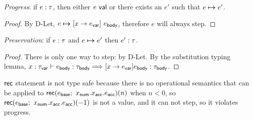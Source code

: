 \documentclass[11pt]{article}
\begin{document}
\textit{Progress}: if $e : \tau$, then either $e\ \mathsf{val}$ or there exists an $e'$ such that $e \boldsymbol{\mapsto} e'$.

\begin{proof}
  By D-Let, $e \boldsymbol{\mapsto} [x \rightarrow e_{\mathsf{var}}] ~ e_{\mathsf{body}}$, therefore $e$ will always step.
\end{proof}

\textit{Preservation}: if $e : \tau$ and $e \boldsymbol{\mapsto} e'$ then $e' : \tau$.

\begin{proof}
  There is only one way to step: by D-Let. By the substitution typing lemma, $x : \tau_{\mathsf{var} }  \vdash e_{\mathsf{body}}  : \tau_{\mathsf{body}}\Longrightarrow[x\to e_{\mathsf{var}}]e_{\mathsf{body}} : \tau_{\mathsf{body}}$.
\end{proof}

$\mathsf{rec}$ statement is not type safe because there is no operational semantics that can be applied to $\mathsf{rec}(e_{\mathsf{base}}; ~ x_{\mathsf{num}}.x_{\mathsf{acc}}.e_{\mathsf{acc}})(n)$ when $n<0$, so $\mathsf{rec}(e_{\mathsf{base}}; ~ x_{\mathsf{num}}.x_{\mathsf{acc}}.e_{\mathsf{acc}})(-1)$ is not a value, and it can not step, so it violates progress.
\end{document}
